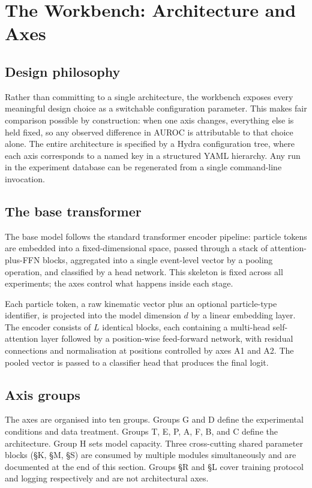 \chapter{The Workbench: Architecture and Axes}

\section{Design philosophy}

Rather than committing to a single architecture, the workbench exposes
every meaningful design choice as a switchable configuration parameter.
This makes fair comparison possible by construction: when one axis
changes, everything else is held fixed, so any observed difference in
AUROC is attributable to that choice alone. The entire architecture is
specified by a Hydra configuration tree, where each axis corresponds to
a named key in a structured YAML hierarchy. Any run in the experiment
database can be regenerated from a single command-line invocation.

\section{The base transformer}

The base model follows the standard transformer encoder pipeline:
particle tokens are embedded into a fixed-dimensional space, passed
through a stack of attention-plus-FFN blocks, aggregated into a single
event-level vector by a pooling operation, and classified by a head
network. This skeleton is fixed across all experiments; the axes
control what happens inside each stage.

Each particle token, a raw kinematic vector plus an optional
particle-type identifier, is projected into the model dimension $d$
by a linear embedding layer. The encoder consists of $L$ identical
blocks, each containing a multi-head self-attention layer followed by
a position-wise feed-forward network, with residual connections and
normalisation at positions controlled by axes A1 and A2. The pooled
vector is passed to a classifier head that produces the final logit.

\section{Axis groups}

The axes are organised into ten groups. Groups G and D define the
experimental conditions and data treatment. Groups T, E, P, A, F, B,
and C define the architecture. Group H sets model capacity. Three
cross-cutting shared parameter blocks (§K, §M, §S) are consumed by
multiple modules simultaneously and are documented at the end of this
section. Groups §R and §L cover training protocol and logging
respectively and are not architectural axes.

